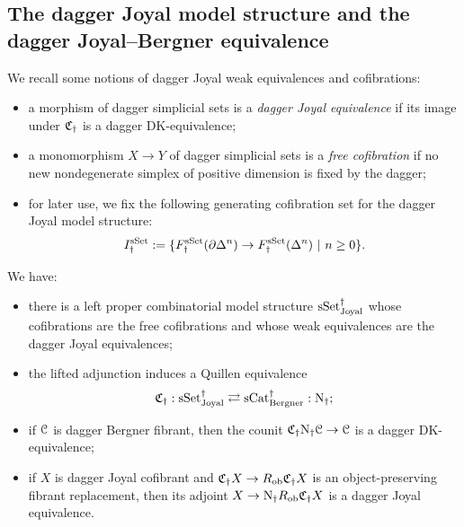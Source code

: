 \documentclass[a4paper,dvipdfmx,11pt]{amsart}
\begin{document}
\subsection{The dagger Joyal model structure and the dagger Joyal--Bergner equivalence}

\begin{definition}
  We recall some notions of dagger Joyal weak equivalences and cofibrations:
  \begin{itemize}
    \item a morphism of dagger simplicial sets is a \emph{dagger Joyal equivalence} if its image under $\mathfrak{C}_{\dag}$ is a dagger DK-equivalence;
    \item a monomorphism $X\to Y$ of dagger simplicial sets is a \emph{free cofibration} if no new nondegenerate simplex of positive dimension is fixed by the dagger;
    \item for later use, we fix the following generating cofibration set for the dagger Joyal model structure:
    \begin{align}
      I^{\mathrm{sSet}}_{\dag}
      :=\{F_{\dag}^{\mathrm{sSet}}(\partial\Delta^n) \to F_{\dag}^{\mathrm{sSet}}(\Delta^n) ~|~ n\geq0\}.
    \end{align}
  \end{itemize}
\end{definition}

\begin{theorem}
  We have:
  \begin{itemize}
    \item there is a left proper combinatorial model structure $\mathrm{sSet}^{\dag}_{\mathrm{Joyal}}$  whose cofibrations are the free cofibrations and whose weak equivalences are the dagger Joyal equivalences;
    \item the lifted adjunction induces a Quillen equivalence
    \begin{align}
      \mathfrak{C}_{\dag}:
      \mathrm{sSet}^{\dag}_{\mathrm{Joyal}}
      \rightleftarrows
      \mathrm{sCat}^{\dag}_{\mathrm{Bergner}}
      :\mathrm{N}_{\dag};
    \end{align}
    \item if $\mathcal{C}$ is dagger Bergner fibrant, then the counit $\mathfrak{C}_{\dag}\mathrm{N}_{\dag}\mathcal{C}\to\mathcal{C}$ is a dagger DK-equivalence;
    \item if $X$ is dagger Joyal cofibrant and $\mathfrak{C}_{\dag}X\to R_{\mathrm{ob}}\mathfrak{C}_{\dag}X$ is an object-preserving fibrant replacement, then its adjoint $X\to \mathrm{N}_{\dag}R_{\mathrm{ob}}\mathfrak{C}_{\dag}X$ is a dagger Joyal equivalence.
  \end{itemize}
\end{theorem}
\end{document}
